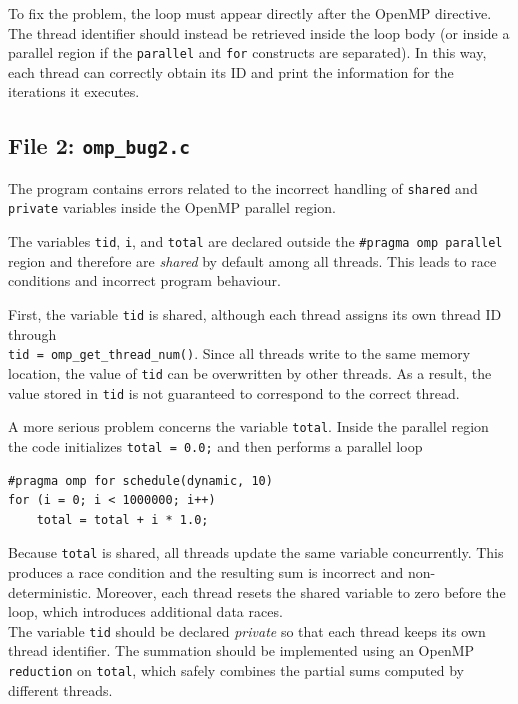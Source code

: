 \documentclass[unicode,10pt,a4paper,oneside,numbers=endperiod,openany]{scrartcl}
\begin{document}
To fix the problem, the loop must appear directly after the OpenMP directive.
The thread identifier should instead be retrieved inside the loop body (or
inside a parallel region if the \texttt{parallel} and \texttt{for} constructs
are separated). In this way, each thread can correctly obtain its ID and print
the information for the iterations it executes.

\subsection{File 2: \texttt{omp\_bug2.c}}
The program contains errors related to the incorrect handling of \texttt{shared} and \texttt{private} variables inside the OpenMP parallel region.

The variables \texttt{tid}, \texttt{i}, and \texttt{total} are declared outside the \texttt{\#pragma omp parallel} region and therefore are \emph{shared} by default among all threads. This leads to race conditions and incorrect program behaviour.

First, the variable \texttt{tid} is shared, although each thread assigns its own thread ID through \\\texttt{tid = omp\_get\_thread\_num()}.
Since all threads write to the same memory location, the value of \texttt{tid} can be overwritten by other threads. As a result, the value stored in \texttt{tid} is not guaranteed to correspond to the correct thread.

A more serious problem concerns the variable \texttt{total}. Inside the parallel region the code initializes \texttt{total = 0.0;} and then performs a parallel loop
\begin{lstlisting}[style=grayverbatim]
#pragma omp for schedule(dynamic, 10)
for (i = 0; i < 1000000; i++)
    total = total + i * 1.0;
\end{lstlisting}
Because \texttt{total} is shared, all threads update the same variable concurrently. This produces a race condition and the resulting sum is incorrect and non-deterministic. Moreover, each thread resets the shared variable to zero before the loop, which introduces additional data races.\\
 The variable \texttt{tid} should be declared \emph{private} so that each thread keeps its own thread identifier. The summation should be implemented using an OpenMP \texttt{reduction} on \texttt{total}, which safely combines the partial sums computed by different threads.
\end{document}
